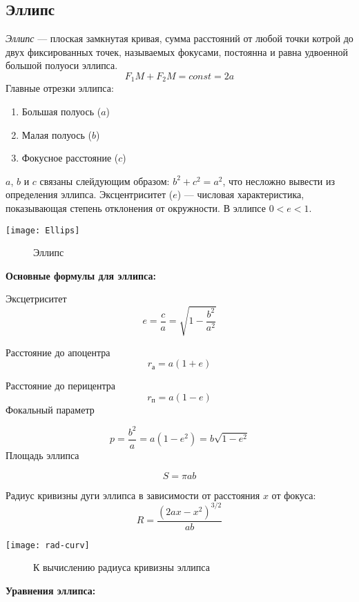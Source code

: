 \subsection{Эллипс}
\textsl{Эллипс} --- плоская замкнутая кривая, сумма расстояний от любой точки котрой до двух фиксированных точек, называемых фокусами, постоянна и равна удвоенной большой полуоси эллипса.
\begin{equation}F_1M+F_2M=const=2a
\end{equation}
Главные отрезки эллипса:
\begin{enumerate}
\item Большая полуось ($a$)
\item Малая полуось ($b$)
\item Фокусное расстояние ($c$)
\end{enumerate}
$a$, $b$ и $c$ связаны слейдующим образом: $b^2+c^2=a^2$, что несложно вывести из определения эллипса.
 Эксцентриситет ($e$) --- числовая характеристика, показывающая степень отклонения от окружности. В эллипсе $0<e<1$.
 \begin{center}
\texttt{[image: Ellips]}
\begin{figure}[h!]
\caption{Эллипс}
\end{figure}
\end{center}
\textbf{Основные формулы для эллипса:}

Эксцетриситет
\begin{equation}
e=\frac{c}{a}=\sqrt{1-\frac{b^2}{a^2}}
\end{equation}

Расстояние до апоцентра
\begin{equation}
r_{\text{а}}=a(1+e)
\end{equation}

Расстояние до перицентра
\begin{equation}
r_{\text{п}}=a(1-e)
\end{equation}
Фокальный параметр

\begin{equation}
p=\frac{b^2}{a}=a(1-e^2)=b\sqrt{1-e^2}
\end{equation}
Площадь эллипса

\begin{equation}
S=\pi ab
\end{equation}

Радиус кривизны дуги эллипса в зависимости от расстояния $x$ от фокуса:
\begin{equation}
R=\frac{(2ax-x^2)^{3/2}}{ab}
\end{equation}
\begin{center}
\texttt{[image: rad-curv]}
\begin{figure}[!h]
\caption{К вычислению радиуса кривизны эллипса}
\end{figure}
\end{center}
\textbf{Уравнения эллипса:}

